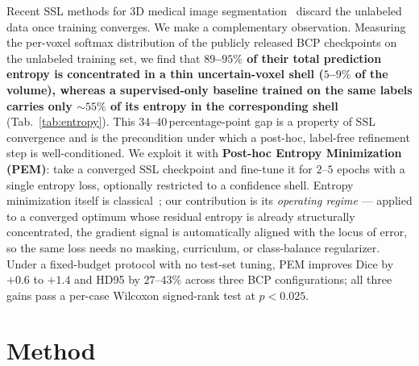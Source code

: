 \documentclass{midl}
\begin{document}
Recent SSL methods for 3D medical image segmentation~\cite{tarvainen2017meanteacher,yu2019uamt,bai2023bcp,liu2024most,assefa2025dycon} discard the unlabeled data once training converges.
We make a complementary observation.
Measuring the per-voxel softmax distribution of the publicly released BCP checkpoints on the unlabeled training set, we find that \textbf{$89$--$95\%$ of their total prediction entropy is concentrated in a thin uncertain-voxel shell ($5$--$9\%$ of the volume), whereas a supervised-only baseline trained on the same labels carries only $\sim$$55\%$ of its entropy in the corresponding shell} (Tab.~\ref{tab:entropy}).
This $34$--$40$\,percentage-point gap is a property of SSL convergence and is the precondition under which a post-hoc, label-free refinement step is well-conditioned.
We exploit it with \textbf{Post-hoc Entropy Minimization (PEM)}: take a converged SSL checkpoint and fine-tune it for $2$--$5$ epochs with a single entropy loss, optionally restricted to a confidence shell.
Entropy minimization itself is classical~\cite{grandvalet2004entropy,sohn2020fixmatch}; our contribution is its \emph{operating regime} --- applied to a converged optimum whose residual entropy is already structurally concentrated, the gradient signal is automatically aligned with the locus of error, so the same loss needs no masking, curriculum, or class-balance regularizer.
Under a fixed-budget protocol with no test-set tuning, PEM improves Dice by $+0.6$ to $+1.4$ and HD95 by $27$--$43\%$ across three BCP configurations; all three gains pass a per-case Wilcoxon signed-rank test at $p\!<\!0.025$.

\section{Method}
\label{sec:method}
\end{document}
